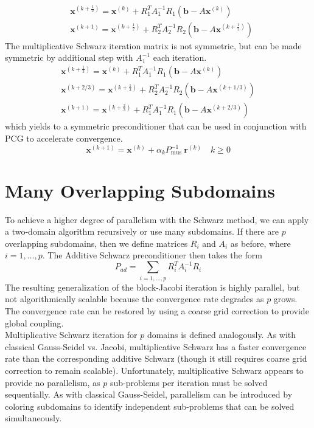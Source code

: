 \documentclass[11pt]{book}
\begin{document}
$$
\begin{aligned}
& \mathbf{x}^{\left(k+\frac{1}{2}\right)}=\mathbf{x}^{(k)}+R_{1}^{T} A_{1}^{-1} R_{1}\left(\mathbf{b}-A \mathbf{x}^{(k)}\right) \\
& \mathbf{x}^{(k+1)}=\mathbf{x}^{\left(k+\frac{1}{2}\right)}+R_{2}^{T} A_{2}^{-1} R_{2}\left(\mathbf{b}-A \mathbf{x}^{\left(k+\frac{1}{2}\right)}\right)
\end{aligned}
$$
The multiplicative Schwarz iteration matrix is not symmetric, but can be made symmetric by additional step with $A_{1}^{-1}$ each iteration.
$$
\begin{gathered}
\mathbf{x}^{\left(k+\frac{1}{3}\right)}=\mathbf{x}^{(k)}+R_{1}^{T} A_{1}^{-1} R_{1}\left(\mathbf{b}-A \mathbf{x}^{(k)}\right) \\
\mathbf{x}^{(k+2 / 3)}=\mathbf{x}^{\left(k+\frac{1}{3}\right)}+R_{2}^{T} A_{2}^{-1} R_{2}\left(\mathbf{b}-A \mathbf{x}^{(k+1 / 3)}\right) \\
\mathbf{x}^{(k+1)}=\mathbf{x}^{\left(k+\frac{2}{3}\right)}+R_{1}^{T} A_{1}^{-1} R_{1}\left(\mathbf{b}-A \mathbf{x}^{(k+2 / 3)}\right)
\end{gathered}
$$
which yields to a symmetric preconditioner that can be used in conjunction with PCG to accelerate convergence.
$$
\mathbf{x}^{(k+1)}=\mathbf{x}^{(k)}+\alpha_{k} P_{\text {mus }}^{-1} \mathbf{r}^{(k)} \quad k \geq 0
$$

\section*{Many Overlapping Subdomains}
To achieve a higher degree of parallelism with the Schwarz method, we can apply a two-domain algorithm recursively or use many subdomains. If there are $p$ overlapping subdomains, then we define matrices $R_{i}$ and $A_{i}$ as before, where $i=1, \ldots, p$. The Additive Schwarz preconditioner then takes the form $$P_{a d}=\sum_{i=1, \ldots, p} R_{i}^{T} A_{i}^{-1} R_{i}$$
The resulting generalization of the block-Jacobi iteration is highly parallel, but not algorithmically scalable because the convergence rate degrades as $p$ grows. The convergence rate can be restored by using a coarse grid correction to provide global coupling. \\
Multiplicative Schwarz iteration for $p$ domains is defined analogously. As with classical Gauss-Seidel vs. Jacobi, multiplicative Schwarz has a faster convergence rate than the corresponding additive Schwarz (though it still requires coarse grid correction to remain scalable). Unfortunately, multiplicative Schwarz appears to provide no parallelism, as $p$ sub-problems per iteration must be solved sequentially. As with classical Gauss-Seidel, parallelism can be introduced by coloring subdomains to identify independent sub-problems that can be solved simultaneously.
\end{document}
